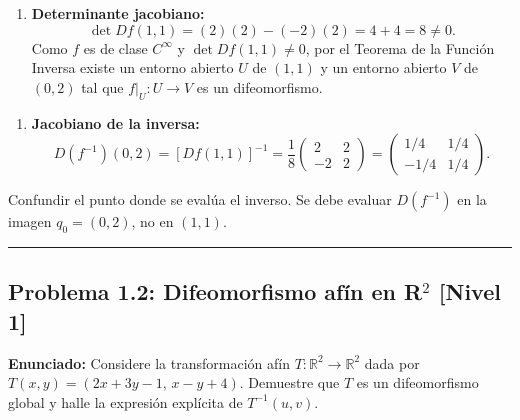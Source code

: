 \documentclass[11pt,a4paper]{article}
\begin{document}
\begin{enumerate}[label=\textbf{\arabic*.}]
\item \textbf{Determinante jacobiano:}
\begin{equation*}
\det Df(1,1) = (2)(2) - (-2)(2) = 4 + 4 = 8 \neq 0.
\end{equation*}
Como $f$ es de clase $C^\infty$ y $\det Df(1,1) \neq 0$, por el Teorema de la Función Inversa existe un entorno abierto $U$ de $(1,1)$ y un entorno abierto $V$ de $(0,2)$ tal que $f|_U: U \to V$ es un difeomorfismo.
\end{enumerate}

\begin{enumerate}[label=\textbf{\arabic*.}]
\item \textbf{Jacobiano de la inversa:}
\begin{equation*}
D(f^{-1})(0,2) = [Df(1,1)]^{-1} = \frac{1}{8} \begin{pmatrix} 2 & 2 \\ -2 & 2 \end{pmatrix} = \begin{pmatrix} 1/4 & 1/4 \\ -1/4 & 1/4 \end{pmatrix}.
\end{equation*}
\end{enumerate}

\begin{trapbox}
Confundir el punto donde se evalúa el inverso. Se debe evaluar $D(f^{-1})$ en la imagen $q_0 = (0,2)$, no en $(1,1)$.
\end{trapbox}

\vspace{0.5cm}
\hrule
\vspace{0.5cm}

\subsection*{Problema 1.2: Difeomorfismo afín en R$^2$ \hfill \color{primaryblue}\small[Nivel 1]}

\begin{tcolorbox}[colback=white,colframe=gray!40,arc=1mm,boxrule=0.5pt,left=3mm,right=3mm,top=2mm,bottom=2mm]
\textbf{Enunciado:} Considere la transformación afín $T: \mathbb{R}^2 \to \mathbb{R}^2$ dada por $T(x,y) = (2x + 3y - 1, \, x - y + 4)$. Demuestre que $T$ es un difeomorfismo global y halle la expresión explícita de $T^{-1}(u,v)$.
\end{tcolorbox}
\end{document}
